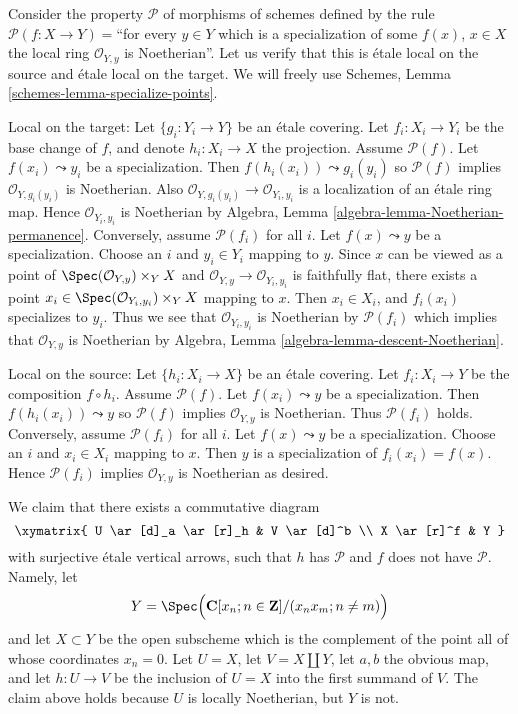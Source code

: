 \begin{example}
\label{example-silly-two}
Consider the property $\mathcal{P}$ of morphisms of schemes defined
by the rule $\mathcal{P}(f : X \to Y) = $``for every $y \in Y$ which is
a specialization of some $f(x)$, $x \in X$ the local ring
$\mathcal{O}_{Y, y}$ is Noetherian''. Let us verify that this is
\'etale local on the source and \'etale local on the target. We will freely use
Schemes, Lemma \ref{schemes-lemma-specialize-points}.

\medskip\noindent
Local on the target:
Let $\{g_i : Y_i \to Y\}$ be an \'etale covering. Let $f_i : X_i \to Y_i$
be the base change of $f$, and denote $h_i : X_i \to X$ the projection.
Assume $\mathcal{P}(f)$. Let $f(x_i) \leadsto y_i$
be a specialization. Then $f(h_i(x_i)) \leadsto g_i(y_i)$ so
$\mathcal{P}(f)$ implies $\mathcal{O}_{Y, g_i(y_i)}$ is Noetherian.
Also $\mathcal{O}_{Y, g_i(y_i)} \to \mathcal{O}_{Y_i, y_i}$ is a
localization of an \'etale ring map.
Hence $\mathcal{O}_{Y_i, y_i}$ is Noetherian by
Algebra, Lemma \ref{algebra-lemma-Noetherian-permanence}.
Conversely, assume $\mathcal{P}(f_i)$ for all $i$. Let $f(x) \leadsto y$
be a specialization. Choose an $i$ and $y_i \in Y_i$ mapping to $y$.
Since $x$ can be viewed as a point of
$\Spec(\mathcal{O}_{Y, y}) \times_Y X$ and
$\mathcal{O}_{Y, y} \to \mathcal{O}_{Y_i, y_i}$ is faithfully flat,
there exists a point
$x_i \in \Spec(\mathcal{O}_{Y_i, y_i}) \times_Y X$
mapping to $x$. Then $x_i \in X_i$, and $f_i(x_i)$ specializes to $y_i$.
Thus we see that $\mathcal{O}_{Y_i, y_i}$ is Noetherian by
$\mathcal{P}(f_i)$ which implies that $\mathcal{O}_{Y, y}$ is
Noetherian by
Algebra, Lemma \ref{algebra-lemma-descent-Noetherian}.

\medskip\noindent
Local on the source:
Let $\{h_i : X_i \to X\}$ be an \'etale covering. Let $f_i : X_i \to Y$
be the composition $f \circ h_i$. Assume $\mathcal{P}(f)$. Let
$f(x_i) \leadsto y$ be a specialization. Then $f(h_i(x_i)) \leadsto y$ so
$\mathcal{P}(f)$ implies $\mathcal{O}_{Y, y}$ is Noetherian. Thus
$\mathcal{P}(f_i)$ holds.
Conversely, assume $\mathcal{P}(f_i)$ for all $i$. Let $f(x) \leadsto y$
be a specialization. Choose an $i$ and $x_i \in X_i$ mapping to $x$.
Then $y$ is a specialization of $f_i(x_i) = f(x)$. Hence
$\mathcal{P}(f_i)$ implies $\mathcal{O}_{Y, y}$ is Noetherian
as desired.

\medskip\noindent
We claim that there exists a commutative diagram
$$
\xymatrix{
U \ar[d]_a \ar[r]_h & V \ar[d]^b \\
X \ar[r]^f & Y
}
$$
with surjective \'etale vertical arrows, such that $h$ has $\mathcal{P}$
and $f$ does not have $\mathcal{P}$. Namely, let
$$
Y =
\Spec\Big(
\mathbf{C}[x_n; n \in \mathbf{Z}]/(x_n x_m; n \not = m)
\Big)
$$
and let $X \subset Y$ be the open subscheme which is the complement of
the point all of whose coordinates $x_n = 0$. Let $U = X$, let
$V = X \amalg Y$, let $a, b$ the obvious map, and let $h : U \to V$
be the inclusion of $U = X$ into the first summand of $V$. The claim above
holds because $U$ is locally Noetherian, but $Y$ is not.
\end{example}

